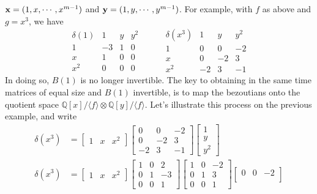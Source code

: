 \documentclass{standalone}
\begin{document}
\begin{rem}
$\bold{x} = (1, x,\cdots, x^{m-1})$ and $\bold{y} = (1, y,\cdots, y^{m-1})$. For example, with $f$ as above and $g = x^3$, we have
$$
\begin{array}{c|ccc}
\delta(1) & 1 & y & y^2\\
\hline
1 & -3 & 1 & 0\\
x & 1 & 0 & 0\\
x^2 & 0 & 0 & 0
\end{array}
\hspace{1cm}
\begin{array}{c|ccc}
\delta(x^3) & 1 & y & y^2\\
\hline
1 & 0 & 0 & -2\\
x & 0 & -2 & 3\\
x^2 & -2 & 3 & -1
\end{array}
$$
In doing so, $B(1)$ is no longer invertible. 
The key to obtaining in the same time matrices of equal size and $B(1)$ invertible, is to map the bezoutians onto the quotient space $\mathbb{Q}[x]/\langle f \rangle \otimes \mathbb{Q}[y]/\langle f \rangle$. Let's illustrate this process on the previous example, and write
\begin{align} \nonumber %
	\delta(x^3) &=
	\begin{bmatrix}
			1 & x & x^2
	\end{bmatrix}
	\begin{bmatrix}
		0 & 0 & -2 \\
		0 & -2 & 3 \\
		-2 & 3 & -1
	\end{bmatrix}
	\begin{bmatrix}
		1 \\
		y \\
		y^2
	\end{bmatrix} \\ \nonumber %
	\delta(x^3) &=
	\begin{bmatrix}
		1 & x & x^2
	\end{bmatrix}
	\begin{bmatrix}
		1 & 0 & 2 \\
		0 & 1 & -3 \\
		0 & 0 & 1
	\end{bmatrix}
	\begin{bmatrix}
		1 & 0 & -2 \\
		0 & 1 & 3 \\
		0 & 0 & 1
	\end{bmatrix}
	\begin{bmatrix}
		0 & 0 & -2 \\

\end{bmatrix}
\end{align}
\end{rem}
\end{document}

